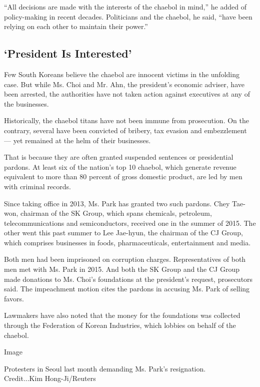 ``All decisions are made with the interests of the chaebol in mind,'' he
added of policy-making in recent decades. Politicians and the chaebol,
he said, ``have been relying on each other to maintain their power.''

\hypertarget{president-is-interested}{%
\subsection{`President Is Interested'}\label{president-is-interested}}

Few South Koreans believe the chaebol are innocent victims in the
unfolding case. But while Ms. Choi and Mr. Ahn, the president's economic
adviser, have been arrested, the authorities have not taken action
against executives at any of the businesses.

Historically, the chaebol titans have not been immune from prosecution.
On the contrary, several have been convicted of bribery, tax evasion and
embezzlement --- yet remained at the helm of their businesses.

That is because they are often granted suspended sentences or
presidential pardons. At least six of the nation's top 10 chaebol, which
generate revenue equivalent to more than 80 percent of gross domestic
product, are led by men with criminal records.

Since taking office in 2013, Ms. Park has granted two such pardons. Chey
Tae-won, chairman of the SK Group, which spans chemicals, petroleum,
telecommunications and semiconductors, received one in the summer of
2015. The other went this past summer to Lee Jae-hyun, the chairman of
the CJ Group, which comprises businesses in foods, pharmaceuticals,
entertainment and media.

Both men had been imprisoned on corruption charges. Representatives of
both men met with Ms. Park in 2015. And both the SK Group and the CJ
Group made donations to Ms. Choi's foundations at the president's
request, prosecutors said. The impeachment motion cites the pardons in
accusing Ms. Park of selling favors.

Lawmakers have also noted that the money for the foundations was
collected through the Federation of Korean Industries, which lobbies on
behalf of the chaebol.

Image

Protesters in Seoul last month demanding Ms. Park's
resignation.\href{http://www.nytimes.com/2016/12/10/world/asia/south-korea-protests-history.html}{\\
}Credit...Kim Hong-Ji/Reuters

